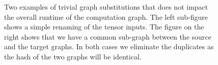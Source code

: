 \begin{figure}[ht]
  \centering
  \quad
  \caption[Two examples of trivial graph substitutions]{Two examples of trivial graph substitutions that does not impact the overall runtime of the computation graph. The left sub-figure shows a simple renaming of the tensor inputs. The figure on the right shows that we have a common sub-graph between the source and the target graphs. In both cases we eliminate the duplicates as the hash of the two graphs will be identical.}
\end{figure}

